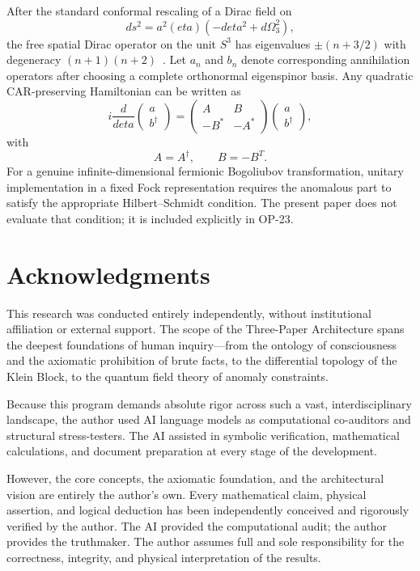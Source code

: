 \documentclass[11pt]{article}
\theoremstyle{canonmath}
\theoremstyle{canonpostulate}
\theoremstyle{canonclaim}
\def\eta{eta}%
\begin{document}
After the standard conformal rescaling of a Dirac field on
\begin{equation}
ds^2=a^2(\eta)\left(-d\eta^2+d\Omega_3^2\right),
\end{equation}
the free spatial Dirac operator on the unit $S^3$ has eigenvalues $\pm(n+3/2)$ with degeneracy $(n+1)(n+2)$~\cite{CortezDiracFRW}. Let $a_n$ and $b_n$ denote corresponding annihilation operators after choosing a complete orthonormal eigenspinor basis. Any quadratic CAR-preserving Hamiltonian can be written as
\begin{equation}
i\frac{d}{d\eta}
\begin{pmatrix}a\\b^\dagger\end{pmatrix}
=
\begin{pmatrix}A&B\\-B^*&-A^*\end{pmatrix}
\begin{pmatrix}a\\b^\dagger\end{pmatrix},
\end{equation}
with
\begin{equation}
A=A^\dagger,
\qquad
B=-B^T.
\end{equation}
For a genuine infinite-dimensional fermionic Bogoliubov transformation, unitary implementation in a fixed Fock representation requires the anomalous part to satisfy the appropriate Hilbert--Schmidt condition. The present paper does not evaluate that condition; it is included explicitly in OP-23.

\section*{Acknowledgments}
This research was conducted entirely independently, without institutional affiliation or external support. The scope of the Three-Paper Architecture spans the deepest foundations of human inquiry---from the ontology of consciousness and the axiomatic prohibition of brute facts, to the differential topology of the Klein Block, to the quantum field theory of anomaly constraints. 

Because this program demands absolute rigor across such a vast, interdisciplinary landscape, the author used AI language models as computational co-auditors and structural stress-testers. The AI assisted in symbolic verification, mathematical calculations, and document preparation at every stage of the development.

However, the core concepts, the axiomatic foundation, and the architectural vision are entirely the author's own. Every mathematical claim, physical assertion, and logical deduction has been independently conceived and rigorously verified by the author. The AI provided the computational audit; the author provides the truthmaker. The author assumes full and sole responsibility for the correctness, integrity, and physical interpretation of the results.
\end{document}
